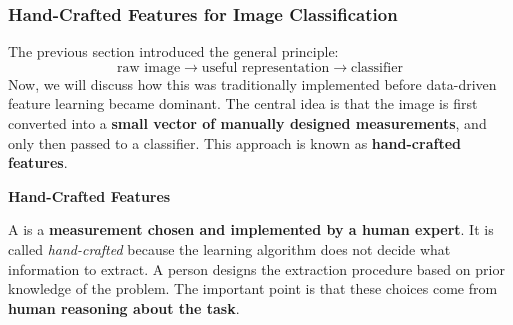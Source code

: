 \subsubsection{Hand-Crafted Features for Image Classification}\label{sec:hand-crafted-features-for-image-classification}

The previous section introduced the general principle:
\begin{equation*}
    \text{raw image} \to \text{useful representation} \to \text{classifier}
\end{equation*}
Now, we will discuss how this was traditionally implemented before data-driven feature learning became dominant. The central idea is that the image is first converted into a \textbf{small vector of manually designed measurements}, and only then passed to a classifier. This approach is known as \textbf{hand-crafted features}.

\highspace
\begin{flushleft}
    \textcolor{Green3}{ \textbf{Hand-Crafted Features}}
\end{flushleft}
A  is a \textbf{measurement chosen and implemented by a human expert}. It is called \emph{hand-crafted} because the learning algorithm does not decide what information to extract. A person designs the extraction procedure based on prior knowledge of the problem. The important point is that these choices come from \textbf{human reasoning about the task}.

